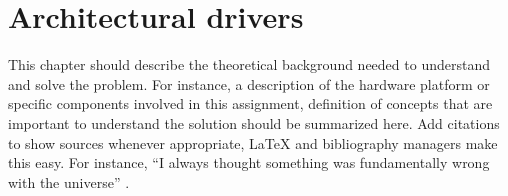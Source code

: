 \chapter{Architectural drivers}
This chapter should describe the theoretical background needed to understand and solve the problem. 
For instance, a description of the hardware platform or specific components involved in this assignment, definition of concepts that are important to understand the solution should be summarized here.
Add citations to show sources whenever appropriate, LaTeX and bibliography managers make this easy. For instance, ``I always thought something was fundamentally wrong with the universe'' \cite{adams1995hitchhiker}.